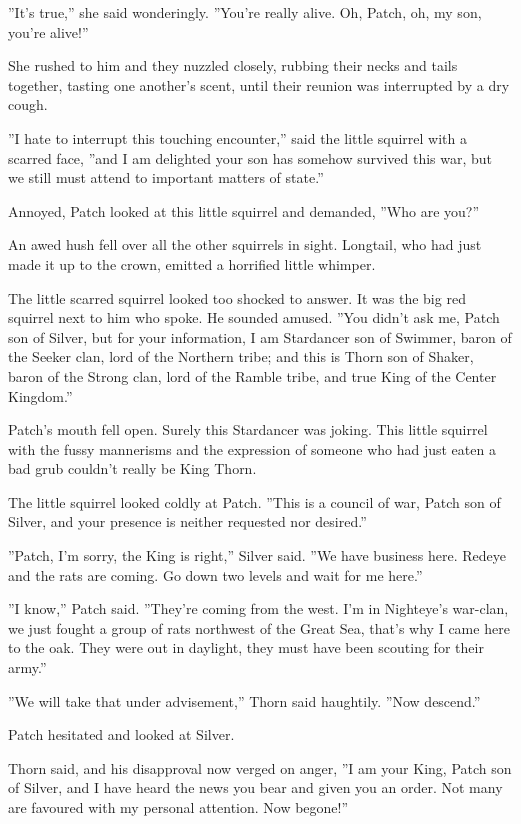 \documentclass[12pt]{book}
\begin{document}
 ''It's true,'' she said wonderingly. ''You're really alive. Oh, Patch, oh, my son, you're alive!''\par
 She rushed to him and they nuzzled closely, rubbing their necks and tails together, tasting one another's scent, until their reunion was interrupted by a dry cough.\par
 ''I hate to interrupt this touching encounter,'' said the little squirrel with a scarred face, ''and I am delighted your son has somehow survived this war, but we still must attend to important matters of state.''\par
 Annoyed, Patch looked at this little squirrel and demanded, ''Who are you?''\par
 An awed hush fell over all the other squirrels in sight. Longtail, who had just made it up to the crown, emitted a horrified little whimper.\par
 The little scarred squirrel looked too shocked to answer. It was the big red squirrel next to him who spoke. He sounded amused. ''You didn't ask me, Patch son of Silver, but for your information, I am Stardancer son of Swimmer, baron of the Seeker clan, lord of the Northern tribe; and this is Thorn son of Shaker, baron of the Strong clan, lord of the Ramble tribe, and true King of the Center Kingdom.''\par
 Patch's mouth fell open. Surely this Stardancer was joking. This little squirrel with the fussy mannerisms and the expression of someone who had just eaten a bad grub couldn't really be King Thorn.\par
 The little squirrel looked coldly at Patch. ''This is a council of war, Patch son of Silver, and your presence is neither requested nor desired.''\par
 ''Patch, I'm sorry, the King is right,'' Silver said. ''We have business here. Redeye and the rats are coming. Go down two levels and wait for me here.''\par
 ''I know,'' Patch said. ''They're coming from the west. I'm in Nighteye's war-clan, we just fought a group of rats northwest of the Great Sea, that's why I came here to the oak. They were out in daylight, they must have been scouting for their army.''\par
 ''We will take that under advisement,'' Thorn said haughtily. ''Now descend.''\par
 Patch hesitated and looked at Silver.\par
 Thorn said, and his disapproval now verged on anger, ''I am your King, Patch son of Silver, and I have heard the news you bear and given you an order. Not many are favoured with my personal attention. Now begone!''\par
\end{document}
